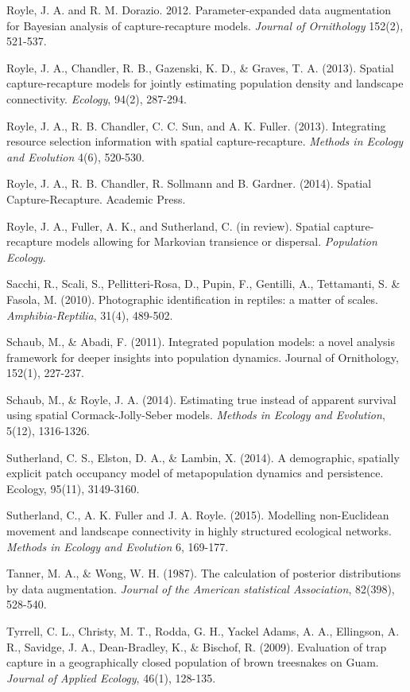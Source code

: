 \documentclass{book}
\begin{document}
\rf Royle, J. A. and R. M. Dorazio. 2012. Parameter-expanded data augmentation for Bayesian analysis of capture-recapture models. {\it Journal of Ornithology} 152(2), 521-537.

\rf Royle, J. A., Chandler, R. B., Gazenski, K. D., \& Graves, T. A. (2013). Spatial capture-recapture models for jointly estimating population density and landscape connectivity. \textit{Ecology}, 94(2), 287-294.

\rf Royle, J. A., R. B. Chandler, C. C. Sun, and A. K. Fuller. (2013). Integrating resource selection information with spatial capture-recapture. {\it Methods in Ecology and Evolution} 4(6), 520-530.

\rf Royle, J. A., R. B. Chandler, R. Sollmann and B. Gardner. (2014). Spatial Capture-Recapture. Academic Press.

\rf Royle, J. A., Fuller, A. K., and Sutherland, C. (in
review). Spatial capture-recapture models allowing for Markovian
transience or dispersal. {\it Population Ecology}.

\rf Sacchi, R., Scali, S., Pellitteri-Rosa, D., Pupin, F., Gentilli, A., Tettamanti, S. \& Fasola, M. (2010). Photographic identification in reptiles: a matter of scales. \textit{Amphibia-Reptilia}, 31(4), 489-502.

\rf Schaub, M., \& Abadi, F. (2011). Integrated population models: a novel analysis framework for deeper insights into population dynamics. Journal of Ornithology, 152(1), 227-237.

\rf Schaub, M., \& Royle, J. A. (2014). Estimating true instead of apparent survival using spatial Cormack-Jolly-Seber models. \textit{Methods in Ecology and Evolution}, 5(12), 1316-1326.

\rf Sutherland, C. S., Elston, D. A., \& Lambin, X. (2014). A demographic, spatially explicit patch occupancy model of metapopulation dynamics and persistence. Ecology, 95(11), 3149-3160.

\rf Sutherland, C., A. K. Fuller and J. A. Royle. (2015). Modelling non-Euclidean movement and landscape connectivity in highly structured ecological networks. {\it Methods in Ecology and Evolution}  6, 169-177.

\rf Tanner, M. A., \& Wong, W. H. (1987). The calculation of posterior distributions by data augmentation. \textit{Journal of the American statistical Association}, 82(398), 528-540.

\rf Tyrrell, C. L., Christy, M. T., Rodda, G. H., Yackel Adams, A. A., Ellingson, A. R., Savidge, J. A., Dean-Bradley, K., \& Bischof, R. (2009). Evaluation of trap capture in a geographically closed population of brown treesnakes on Guam. \textit{Journal of Applied Ecology}, 46(1), 128-135.
\end{document}

